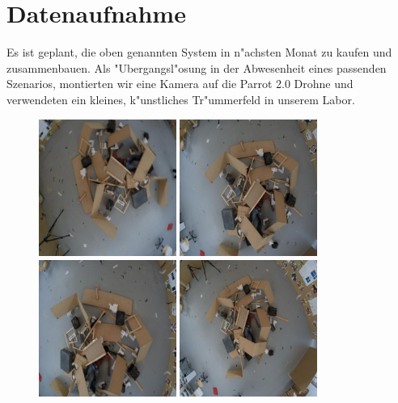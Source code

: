 \documentclass[a4paper]{article}
\begin{document}
\section*{Datenaufnahme} 
Es ist geplant, die oben genannten System in n"achsten Monat zu kaufen und zusammenbauen. Als "Ubergangsl"osung in der Abwesenheit eines passenden Szenarios, montierten wir eine Kamera auf die Parrot 2.0 Drohne und verwendeten ein kleines, k"unstliches Tr"ummerfeld in unserem Labor.
\begin{figure}[h]
\centering
\includegraphics[width=0.4\textwidth]{G0020587.JPG} %
\qquad\qquad
\includegraphics[width=0.4\textwidth]{G0020592.JPG}\vspace{3mm}
\includegraphics[width=0.4\textwidth]{G0020628.JPG} %
\qquad\qquad
\includegraphics[width=0.4\textwidth]{G0020651.JPG}
\end{figure}
\end{document}
